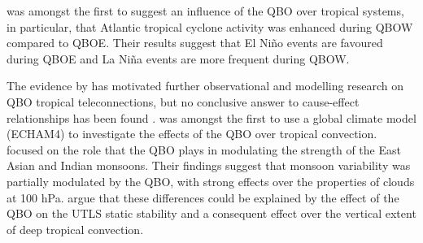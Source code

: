\cite{gray1984} was amongst the first to suggest an influence of the QBO over tropical systems, in particular, that Atlantic tropical cyclone activity was enhanced during QBOW compared to QBOE. 
 Their results suggest that El Niño events are favoured during QBOE and  La Niña events are more frequent during QBOW.

The evidence by \cite{gray1992} has motivated further observational and modelling research on QBO tropical teleconnections, but no conclusive answer to cause-effect relationships has been found \citep[e.g.][]{chan1995,camargo2010,hansen2016tropospheric}. 
\cite{giorgetta1999} was amongst the first to use a global climate model (ECHAM4) to investigate the effects of the QBO over tropical convection. \cite{giorgetta1999} focused on the role that the QBO plays in modulating the strength of the East Asian and Indian monsoons. Their findings suggest that monsoon variability was partially modulated by the QBO, with strong effects over the properties of clouds at 100 hPa. \cite{giorgetta1999} argue that these differences could be explained by the effect of the QBO on the UTLS static stability and a consequent effect over the vertical extent of deep tropical convection. 

